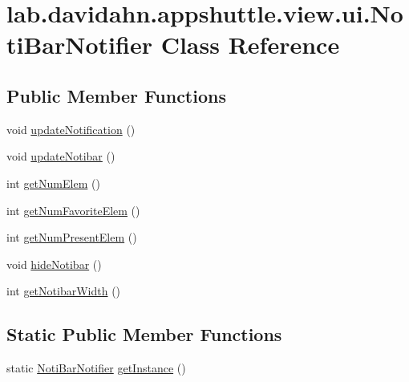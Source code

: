 \hypertarget{classlab_1_1davidahn_1_1appshuttle_1_1view_1_1ui_1_1_noti_bar_notifier}{\section{lab.\-davidahn.\-appshuttle.\-view.\-ui.\-Noti\-Bar\-Notifier \-Class \-Reference}
\label{classlab_1_1davidahn_1_1appshuttle_1_1view_1_1ui_1_1_noti_bar_notifier}
}
\subsection*{\-Public \-Member \-Functions}
\begin{DoxyCompactItemize}
\item 
void \hyperlink{classlab_1_1davidahn_1_1appshuttle_1_1view_1_1ui_1_1_noti_bar_notifier_a61fb58e40b6d05f98efe8f34d1077d41}{update\-Notification} ()
\item 
void \hyperlink{classlab_1_1davidahn_1_1appshuttle_1_1view_1_1ui_1_1_noti_bar_notifier_a708b3a02d0f0a29a7f4f3f47afa7940f}{update\-Notibar} ()
\item 
int \hyperlink{classlab_1_1davidahn_1_1appshuttle_1_1view_1_1ui_1_1_noti_bar_notifier_ae9ddd6bb783d361bc8b7c7f88625255f}{get\-Num\-Elem} ()
\item 
int \hyperlink{classlab_1_1davidahn_1_1appshuttle_1_1view_1_1ui_1_1_noti_bar_notifier_a495beeed0f4480c041ee2e34023ce26b}{get\-Num\-Favorite\-Elem} ()
\item 
int \hyperlink{classlab_1_1davidahn_1_1appshuttle_1_1view_1_1ui_1_1_noti_bar_notifier_a8a5436babc39125176f8837ecd9b33b1}{get\-Num\-Present\-Elem} ()
\item 
void \hyperlink{classlab_1_1davidahn_1_1appshuttle_1_1view_1_1ui_1_1_noti_bar_notifier_a02bc68611742f5b3349ed560612684e2}{hide\-Notibar} ()
\item 
int \hyperlink{classlab_1_1davidahn_1_1appshuttle_1_1view_1_1ui_1_1_noti_bar_notifier_a6ea620431f38a93a4937640b3d00a861}{get\-Notibar\-Width} ()
\end{DoxyCompactItemize}
\subsection*{\-Static \-Public \-Member \-Functions}
\begin{DoxyCompactItemize}
\item 
static \hyperlink{classlab_1_1davidahn_1_1appshuttle_1_1view_1_1ui_1_1_noti_bar_notifier}{\-Noti\-Bar\-Notifier} \hyperlink{classlab_1_1davidahn_1_1appshuttle_1_1view_1_1ui_1_1_noti_bar_notifier_a2004b7944bd5e95dd9d211d1772821af}{get\-Instance} ()
\end{DoxyCompactItemize}
